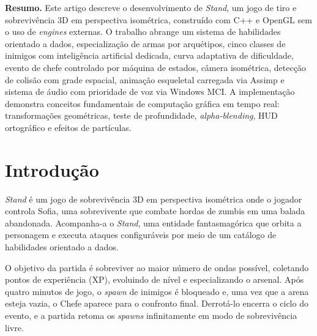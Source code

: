 \documentclass[12pt,a4paper]{article}
\begin{document}
\vspace{8pt}

\noindent
\begin{minipage}[t]{\dimexpr\linewidth-1.6cm}
    \hspace{0.8cm}%
    \begin{minipage}[t]{\dimexpr\linewidth-0.8cm}
        \fontsize{12}{14}\selectfont
        \textbf{Resumo.} Este artigo descreve o desenvolvimento de
        \textit{Stand}, um jogo de tiro e sobrevivência 3D em perspectiva
        isométrica, construído com C++ e OpenGL sem o uso de \textit{engines}
        externas.
        O trabalho abrange um sistema de habilidades orientado a dados,
        especialização de armas por arquétipos, cinco classes de inimigos com
        inteligência artificial dedicada, curva adaptativa de dificuldade,
        evento de chefe controlado por máquina de estados, câmera isométrica,
        detecção de colisão com grade espacial, animação esqueletal carregada
        via Assimp e sistema de áudio com prioridade de voz via Windows MCI.
        A implementação demonstra conceitos fundamentais de computação gráfica
        em tempo real: transformações geométricas, teste de profundidade,
        \textit{alpha-blending}, HUD ortográfico e efeitos de partículas.
    \end{minipage}
\end{minipage}

\section{Introdução}

\textit{Stand} é um jogo de sobrevivência 3D em perspectiva isométrica onde
o jogador controla Sofia, uma sobrevivente que combate hordas de zumbis em
uma balada abandonada.
Acompanha-a o \textit{Stand}, uma entidade fantasmagórica que orbita a
personagem e executa ataques configuráveis por meio de um catálogo de
habilidades orientado a dados.

O objetivo da partida é sobreviver ao maior número de ondas possível,
coletando pontos de experiência (XP), evoluindo de nível e especializando o
arsenal.
Após quatro minutos de jogo, o \textit{spawn} de inimigos é bloqueado e, uma
vez que a arena esteja vazia, o Chefe aparece para o confronto final.
Derrotá-lo encerra o ciclo do evento, e a partida retoma os \textit{spawns}
infinitamente em modo de sobrevivência livre.
\end{document}
